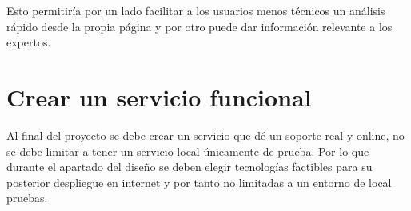 Esto permitiría por un lado facilitar a los usuarios menos técnicos un análisis rápido desde la propia página y por otro puede dar información relevante a los expertos.

\section{Crear un servicio funcional}
Al final del proyecto se debe crear un servicio que dé un soporte real y online, no se debe limitar a tener un servicio local únicamente de prueba. Por lo que durante el apartado del diseño se deben elegir tecnologías factibles para su posterior despliegue en internet y por tanto no limitadas a un entorno de local pruebas.